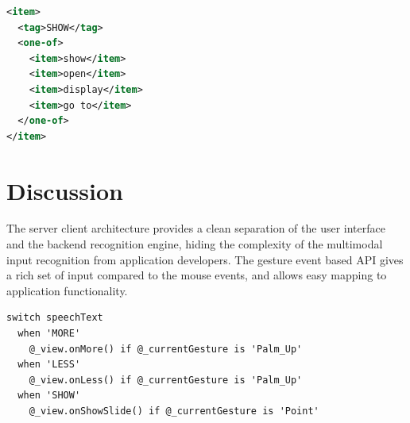 \begin{lstlisting}[caption={An example of grammar definition in XML.},
language=XML, label={lst:grammar}] 
<item>
  <tag>SHOW</tag>
  <one-of>
    <item>show</item>
    <item>open</item>
    <item>display</item>
    <item>go to</item>
  </one-of>
</item>
\end{lstlisting}

\section{Discussion}
The server client architecture provides a clean separation of the user
interface and the backend recognition engine, hiding the complexity of the
multimodal input recognition from application developers. The gesture event
based API gives a rich set of input compared to the mouse events, and allows
easy mapping to application functionality.

\begin{lstlisting}[caption={Code for speech events in CoffeeScript.},
label={lst:speech-code}] switch speechText
  when 'MORE'
    @_view.onMore() if @_currentGesture is 'Palm_Up'
  when 'LESS'
    @_view.onLess() if @_currentGesture is 'Palm_Up'
  when 'SHOW'
    @_view.onShowSlide() if @_currentGesture is 'Point'
\end{lstlisting}

